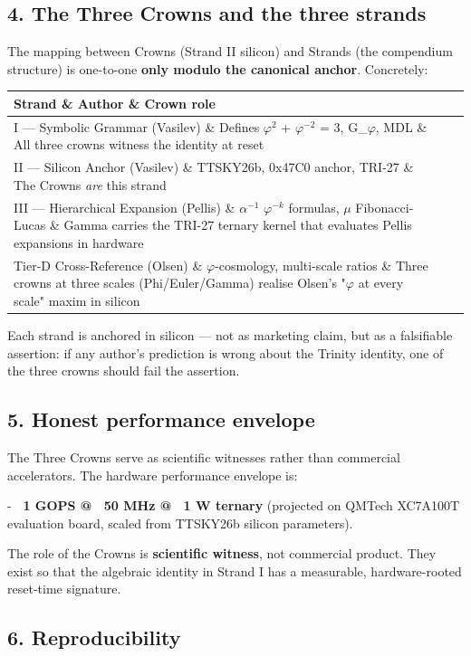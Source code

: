 \subsection{4. The Three Crowns and the three strands}

The mapping between Crowns (Strand II silicon) and Strands (the compendium structure) is one-to-one \textbf{only modulo the canonical anchor}. Concretely:

\begin{tabular}{|l|l|l|}
\hline
Strand \& Author \& Crown role \\
\hline
I --- Symbolic Grammar (Vasilev) \& Defines $\varphi^{2}$ + $\varphi^{-2}$ = 3, G\_$\varphi$, MDL \& All three crowns witness the identity at reset \\
II --- Silicon Anchor (Vasilev) \& TTSKY26b, 0x47C0 anchor, TRI-27 \& The Crowns \textit{are} this strand \\
III --- Hierarchical Expansion (Pellis) \& $\alpha^{-1}$ $\varphi^{-k}$ formulas, $\mu$ Fibonacci-Lucas \& Gamma carries the TRI-27 ternary kernel that evaluates Pellis expansions in hardware \\
Tier-D Cross-Reference (Olsen) \& $\varphi$-cosmology, multi-scale ratios \& Three crowns at three scales (Phi/Euler/Gamma) realise Olsen's "$\varphi$ at every scale" maxim in silicon \\
\hline
\end{tabular}
Each strand is anchored in silicon --- not as marketing claim, but as a falsifiable assertion: if any author's prediction is wrong about the Trinity identity, one of the three crowns should fail the assertion.

\subsection{5. Honest performance envelope}

The Three Crowns serve as scientific witnesses rather than commercial accelerators. The hardware performance envelope is:

- \textbf{~1 GOPS @ ~50 MHz @ ~1 W ternary} (projected on QMTech XC7A100T evaluation board, scaled from TTSKY26b silicon parameters).

The role of the Crowns is \textbf{scientific witness}, not commercial product. They exist so that the algebraic identity in Strand I has a measurable, hardware-rooted reset-time signature.

\subsection{6. Reproducibility}

